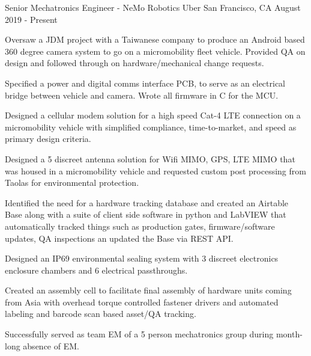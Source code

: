 

\begin{cventries}

  \cventry
    {Senior Mechatronics Engineer - NeMo Robotics} %
    {Uber} %
    {San Francisco, CA} %
    {August 2019 - Present} %
    {
      \begin{cvitems} %
        \item {Oversaw a JDM project with a Taiwanese company to produce an Android based 360 degree camera system to go on a micromobility fleet vehicle. Provided QA on design and followed through on hardware/mechanical change requests.}
        \item {Specified a power and digital comms interface PCB, to serve as an electrical bridge between vehicle and camera. Wrote all firmware in C for the MCU.}
        \item {Designed a cellular modem solution for a high speed Cat-4 LTE
            connection on a micromobility vehicle with simplified compliance,
        time-to-market, and speed as primary design criteria.}
        \item {Designed a 5 discreet antenna solution for Wifi MIMO, GPS, LTE MIMO that was housed in a micromobility vehicle and requested custom post processing from Taolas for environmental protection.}
        \item {Identified the need for a hardware tracking database and created an Airtable Base along with a suite of client side software in python and LabVIEW that automatically tracked things such as production gates, firmware/software updates, QA inspections an updated the Base via REST API.}
        \item {Designed an IP69 environmental sealing system with 3 discreet electronics enclosure chambers and 6 electrical passthroughs.}
        \item {Created an assembly cell to facilitate final assembly of hardware units coming from Asia with overhead torque controlled fastener drivers and automated labeling and barcode scan based asset/QA tracking.}
        \item {Successfully served as team EM of a 5 person mechatronics group during month-long absence of EM.}
      \end{cvitems}
    }


\end{cventries}

